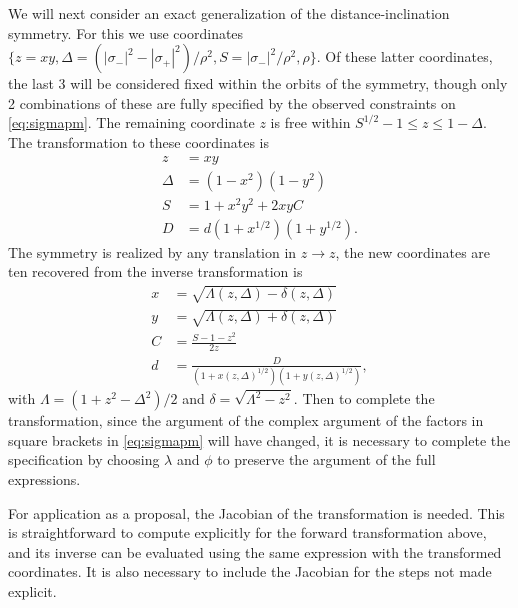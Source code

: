 \documentclass[aps,showpacs,twocolumn,prd,superscriptaddress,nofootinbib]{revtex4}
\begin{document}
We will next consider an exact generalization of the distance-inclination symmetry. For this we use coordinates $\{z=xy,\Delta=(|\sigma_-|^2-|\sigma_+|^2)/\rho^2,S=|\sigma_-|^2/\rho^2,\rho\}$.  Of these latter coordinates, the last 3 will be considered fixed within the orbits of the symmetry, though only 2 combinations of these are fully specified by the observed constraints on \eqref{eq:sigmapm}. The remaining coordinate $z$ is free within $S^{1/2}-1\leq z\leq 1-\Delta$. The transformation to these coordinates is
\begin{align}
  z&=xy\\
  \Delta&=(1-x^2)(1-y^2)\\
  S&=1+x^2y^2+2xyC\\
  D&=d(1+x^{1/2})(1+y^{1/2}).
\end{align}
The symmetry is realized by any translation in $z\rightarrow z$, the new coordinates are ten recovered from the inverse transformation is 
\begin{align}
  x&=\sqrt{\Lambda(z,\Delta)-\delta(z,\Delta)}\\
  y&=\sqrt{\Lambda(z,\Delta)+\delta(z,\Delta)}\\
  C&=\frac{S-1-z^2}{2z}\\
  d&=\frac D{(1+x(z,\Delta)^{1/2})(1+y(z,\Delta)^{1/2})},
\end{align}
with $\Lambda=(1+z^2-\Delta^2)/2$ and $\delta=\sqrt{\Lambda^2-z^2}$.
Then to complete the transformation, since the argument of the complex argument of the factors in square brackets in \eqref{eq:sigmapm} will have changed, it is necessary to complete the specification by choosing $\lambda$ and $\phi$ to preserve the argument of the full expressions.

For application as a proposal, the Jacobian of the transformation is needed.  This is straightforward to compute explicitly for the forward transformation above, and its inverse can be evaluated using the same expression with the transformed coordinates.  It is also necessary to include the Jacobian for the steps not made explicit.
\end{document}

